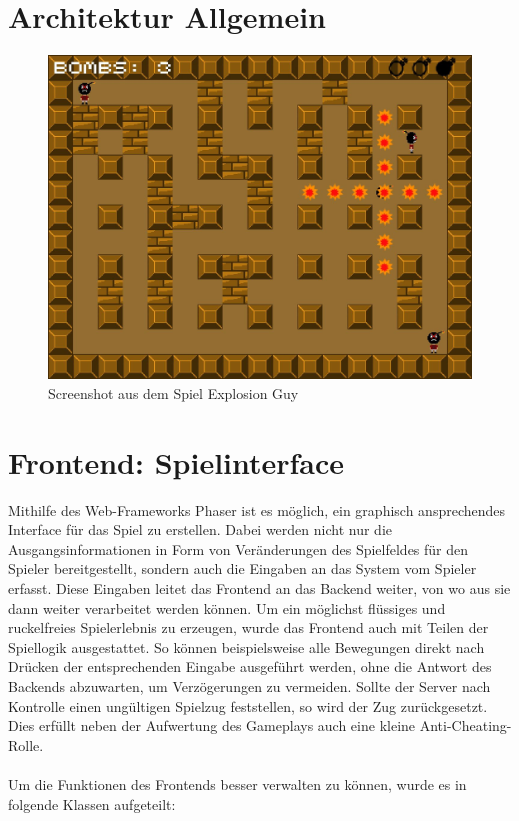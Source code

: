 \documentclass[conference]{IEEEtran}
\begin{document}
\section{Architektur Allgemein}
\begin{figure}
    \centering
    \includegraphics[width=\textwidth]{Screenshotgame.jpg}
    \caption{Screenshot aus dem Spiel Explosion Guy}
\end{figure}

\section{Frontend: Spielinterface}
Mithilfe des Web-Frameworks Phaser\cite{phaser} ist es möglich, ein graphisch ansprechendes Interface für das Spiel zu erstellen. Dabei werden nicht nur die Ausgangsinformationen in Form von Veränderungen des Spielfeldes für den Spieler bereitgestellt, sondern auch die Eingaben an das System vom Spieler erfasst. Diese Eingaben leitet das Frontend an das Backend weiter, von wo aus sie dann weiter verarbeitet werden können. Um ein möglichst flüssiges und ruckelfreies Spielerlebnis zu erzeugen, wurde das Frontend auch mit Teilen der Spiellogik ausgestattet. So können beispielsweise alle Bewegungen direkt nach Drücken der entsprechenden Eingabe ausgeführt werden, ohne die Antwort des Backends abzuwarten, um Verzögerungen zu vermeiden. Sollte der Server nach Kontrolle einen ungültigen Spielzug feststellen, so wird der Zug zurückgesetzt. Dies erfüllt neben der Aufwertung des Gameplays auch eine kleine Anti-Cheating-Rolle.
\\
\\
Um die Funktionen des Frontends besser verwalten zu können, wurde es in folgende Klassen aufgeteilt:
\end{document}
